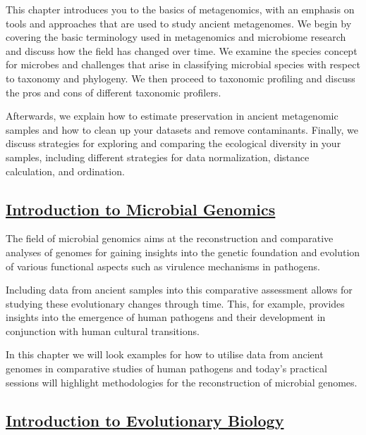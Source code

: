 \documentclass[
  letterpaper,
]{book}
\begin{document}
This chapter introduces you to the basics of metagenomics, with an
emphasis on tools and approaches that are used to study ancient
metagenomes. We begin by covering the basic terminology used in
metagenomics and microbiome research and discuss how the field has
changed over time. We examine the species concept for microbes and
challenges that arise in classifying microbial species with respect to
taxonomy and phylogeny. We then proceed to taxonomic profiling and
discuss the pros and cons of different taxonomic profilers.

Afterwards, we explain how to estimate preservation in ancient
metagenomic samples and how to clean up your datasets and remove
contaminants. Finally, we discuss strategies for exploring and comparing
the ecological diversity in your samples, including different strategies
for data normalization, distance calculation, and ordination.

\hypertarget{introduction-to-microbial-genomics}{%
\subsection*{\texorpdfstring{\protect\hyperlink{introduction-to-microbial-genomics-1}{Introduction
to Microbial
Genomics}}{Introduction to Microbial Genomics}}\label{introduction-to-microbial-genomics}}

The field of microbial genomics aims at the reconstruction and
comparative analyses of genomes for gaining insights into the genetic
foundation and evolution of various functional aspects such as virulence
mechanisms in pathogens.

Including data from ancient samples into this comparative assessment
allows for studying these evolutionary changes through time. This, for
example, provides insights into the emergence of human pathogens and
their development in conjunction with human cultural transitions.

In this chapter we will look examples for how to utilise data from
ancient genomes in comparative studies of human pathogens and today's
practical sessions will highlight methodologies for the reconstruction
of microbial genomes.

\hypertarget{introduction-to-evolutionary-biology}{%
\subsection*{\texorpdfstring{\protect\hyperlink{introduction-to-evolutionary-biology-1}{Introduction
to Evolutionary
Biology}}{Introduction to Evolutionary Biology}}\label{introduction-to-evolutionary-biology}}
\end{document}
